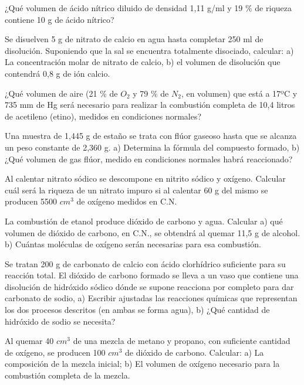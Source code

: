 \begin{problem}
¿Qué volumen de ácido nítrico diluido de densidad 1,11 g/ml y 19 \% de riqueza contiene 10 g de ácido nítrico?
\end{problem}
\begin{problem}
Se disuelven 5 g de nitrato de calcio en agua hasta completar 250 ml de disolución. Suponiendo que la sal se encuentra totalmente disociado, calcular: a) La concentración molar de nitrato de calcio, b) el volumen de disolución que contendrá 0,8 g de ión calcio.
\end{problem}
\begin{problem}
¿Qué volumen de aire (21 \% de $O_2$ y 79 \% de $N_2$, en volumen) que está a 17ºC y 735 mm de Hg será necesario para realizar la combustión completa de 10,4 litros de acetileno (etino), medidos en condiciones normales?	
\end{problem}
\begin{problem}
Una muestra de 1,445 g de estaño se trata con flúor gaseoso hasta que se alcanza un peso constante de 2,360 g. a) Determina la fórmula del compuesto formado, b) ¿Qué volumen de gas flúor, medido en condiciones normales habrá reaccionado?
\end{problem}
\begin{problem}
Al calentar nitrato sódico se descompone en nitrito sódico y oxígeno. Calcular cuál será la riqueza de un nitrato impuro si al calentar 60 g del mismo se producen 5500 $cm^3$ de oxígeno medidos en C.N.
\end{problem}
\begin{problem}
La combustión de etanol produce dióxido de carbono y agua. Calcular a) qué volumen de dióxido de carbono, en C.N., se obtendrá al quemar 11,5 g de alcohol. b) Cuántas moléculas de oxígeno serán necesarias para esa combustión.	
\end{problem}
\begin{problem}
Se tratan 200 g de carbonato de calcio con ácido clorhídrico suficiente para su reacción total. El dióxido de carbono formado se lleva a un vaso que contiene una disolución de hidróxido sódico dónde se supone reacciona por completo para dar carbonato de sodio, a) Escribir ajustadas las reacciones químicas que representan los dos procesos descritos (en ambas se forma agua), b) ¿Qué cantidad de hidróxido de sodio se necesita?	
\end{problem}
\begin{problem}
Al quemar 40 $cm^3$ de una mezcla de metano y propano, con suficiente cantidad de oxígeno, se producen 100 $cm^3$ de dióxido de carbono. Calcular: a) La composición de la mezcla inicial; b) El volumen de oxígeno necesario para la combustión completa de la mezcla.	
\end{problem}
